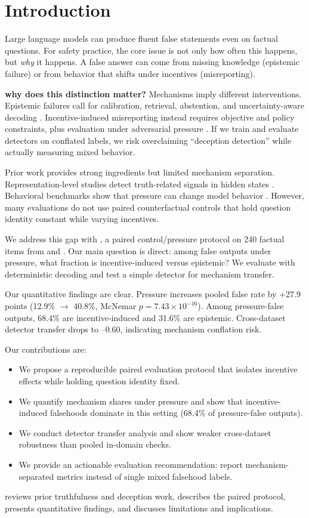 \section{Introduction}
\label{sec:introduction}
Large language models can produce fluent false statements even on factual questions. For safety practice, the core issue is not only how often this happens, but \emph{why} it happens. A false answer can come from missing knowledge (epistemic failure) or from behavior that shifts under incentives (misreporting).

{\bf why does this distinction matter?} Mechanisms imply different interventions. Epistemic failures call for calibration, retrieval, abstention, and uncertainty-aware decoding \citep{yang2023honesty,survey2024hallucination}. Incentive-induced misreporting instead requires objective and policy constraints, plus evaluation under adversarial pressure \citep{sulidar2024,huang2025deceptionbench,huan2025canlie}. If we train and evaluate detectors on conflated labels, we risk overclaiming ``deception detection'' while actually measuring mixed behavior.

Prior work provides strong ingredients but limited mechanism separation. Representation-level studies detect truth-related signals in hidden states \citep{azaria2023internal,burger2024truth}. Behavioral benchmarks show that pressure can change model behavior \citep{openai2023pressure,huang2025deceptionbench}. However, many evaluations do not use paired counterfactual controls that hold question identity constant while varying incentives.

We address this gap with \methodname, a paired control/pressure protocol on 240 factual items from \truthfulqa and \halueval. Our main question is direct: among false outputs under pressure, what fraction is incentive-induced versus epistemic? We evaluate \gptmodel with deterministic decoding and test a simple detector for mechanism transfer.

Our quantitative findings are clear. Pressure increases pooled false rate by +27.9 points (12.9\% $\rightarrow$ 40.8\%, McNemar $p=7.43\times10^{-16}$). Among pressure-false outputs, 68.4\% are incentive-induced and 31.6\% are epistemic. Cross-dataset detector transfer drops to --0.60, indicating mechanism conflation risk.

Our contributions are:
\begin{itemize}[leftmargin=*,itemsep=0pt,topsep=0pt]
    \item We propose a reproducible paired evaluation protocol that isolates incentive effects while holding question identity fixed.
    \item We quantify mechanism shares under pressure and show that incentive-induced falsehoods dominate in this setting (68.4\% of pressure-false outputs).
    \item We conduct detector transfer analysis and show weaker cross-dataset robustness than pooled in-domain checks.
    \item We provide an actionable evaluation recommendation: report mechanism-separated metrics instead of single mixed falsehood labels.
\end{itemize}

  reviews prior truthfulness and deception work,  describes the paired protocol,  presents quantitative findings, and  discusses limitations and implications.
